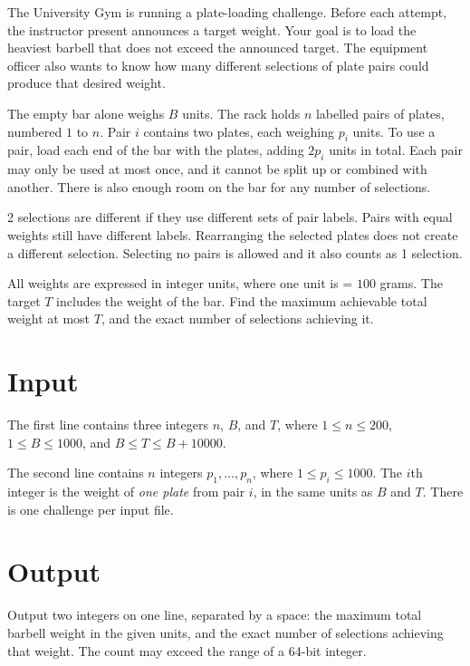 \ifdefined\problemheader
  \let\originalproblemheader\problemheader
  \renewcommand{\problemheader}[2]{\originalproblemheader{#1}{problem-36-24527669}}
\fi
\setlength{\parindent}{0pt}
\setlength{\parskip}{4pt}

The University Gym is running a plate-loading challenge. Before each
attempt, the instructor present announces a target weight. Your goal is to load the heaviest
barbell that does not exceed the announced target. The equipment officer also wants to
know how many different selections of plate pairs could produce that desired weight.

The empty bar alone weighs $B$ units. The rack holds $n$ labelled pairs of plates,
numbered $1$ to $n$. Pair $i$ contains two plates, each weighing $p_i$ units.
To use a pair, load each end of the bar with the plates, adding $2p_i$
units in total. Each pair may only be used at most once, and it cannot be split up or combined 
with another. There is also enough room on the bar for any number of selections.

2 selections are different if they use different sets of pair labels.
Pairs with equal weights still have different labels. 
Rearranging the selected plates does not create a different selection. 
Selecting no pairs is allowed and it also counts as 1 selection.

All weights are expressed in integer units, where one unit is =  $100$ grams.
The target $T$ includes the weight of the bar. Find the maximum achievable
total weight at most $T$, and the exact number of selections achieving it.

\section*{Input}
The first line contains three integers $n$, $B$, and $T$, where
$1 \leq n \leq 200$, $1 \leq B \leq 1000$, and $B \leq T \leq B+10000$.

The second line contains $n$ integers $p_1,\ldots,p_n$, where
$1 \leq p_i \leq 1000$. The $i$th integer is the weight of \emph{one plate}
from pair $i$, in the same units as $B$ and $T$.
There is one challenge per input file.

\section*{Output}
Output two integers on one line, separated by a space: the maximum total
barbell weight in the given units, and the exact number of selections
achieving that weight.
The count may exceed the range of a 64-bit integer.

